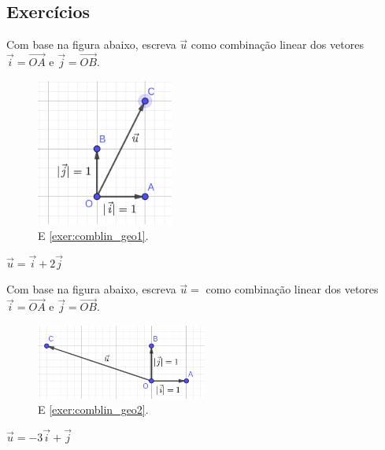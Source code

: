 \subsection*{Exercícios}

\begin{exer}\label{exer:comblin_geo1}
  Com base na figura abaixo, escreva $\vec{u}$ como combinação linear dos vetores $\vec{i}=\overrightarrow{OA}$ e $\vec{j}=\overrightarrow{OB}$.

  \begin{figure}[H]
    \centering
    \includegraphics[width=0.4\textwidth]{cap_base/dados/fig_comblin_exer_geo/fig_comblin_exer_geo1}    
    \caption{E \ref{exer:comblin_geo1}.}
    \label{fig:comblin_geo1}
  \end{figure}
\end{exer}
\begin{resp}
  $\vec{u}=\vec{i}+2\vec{j}$
\end{resp}

\begin{exer}\label{exer:comblin_geo2}
  Com base na figura abaixo, escreva $\vec{u}=$ como combinação linear dos vetores $\vec{i}=\overrightarrow{OA}$ e $\vec{j}=\overrightarrow{OB}$.

  \begin{figure}[H]
    \centering
    \includegraphics[width=0.5\textwidth]{cap_base/dados/fig_comblin_exer_geo/fig_comblin_exer_geo2}    
    \caption{E \ref{exer:comblin_geo2}.}
    \label{fig:comblin_geo2}
  \end{figure}
\end{exer}
\begin{resp}
  $\vec{u}=-3\vec{i}+\vec{j}$
\end{resp}

